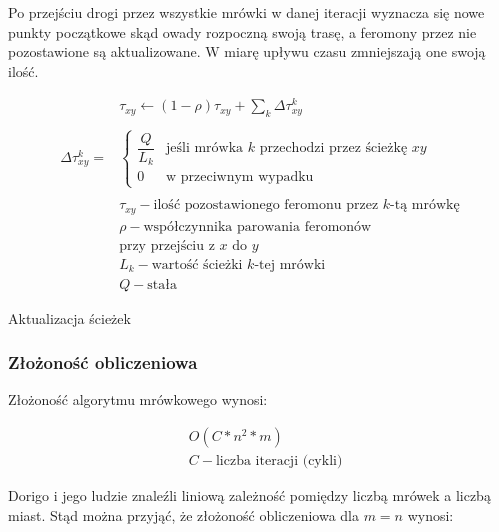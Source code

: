 \documentclass[12pt,a4paper,titlepage]{article}
\begin{document}
Po przejściu drogi przez wszystkie mrówki w danej iteracji wyznacza się nowe punkty początkowe skąd owady rozpoczną swoją trasę, a feromony przez nie pozostawione są aktualizowane. W miarę upływu czasu zmniejszają one swoją ilość.
\begin{myequation}[H]
\begin{equation}
    \begin{split}
        &\tau_{xy}\gets(1- \rho)\tau_{xy} + \sum\limits_{k}\Delta\tau^{k}_{xy} \\\\
        \Delta\tau^{k}_{xy} = 
        &\begin{cases}
            \dfrac{Q}{L_{k}} & \text{jeśli mrówka $k$ przechodzi przez ścieżkę $xy$} \\
            0 & \text{w przeciwnym wypadku}
        \end{cases} \\\\
        &\tau_{xy} - \text{ilość pozostawionego feromonu przez $k$-tą mrówkę} \\
        &\rho - \text{współczynnika parowania feromonów} \\
        &\text{przy przejściu z $x$ do $y$} \\
        &L_{k} - \text{wartość ścieżki $k$-tej mrówki} \\
        &Q - \text{stała}
    \end{split}
\end{equation}
\caption{Aktualizacja ścieżek}
\end{myequation}

\subsubsection{Złożoność obliczeniowa}
Złożoność algorytmu mrówkowego wynosi\cite{aco_pwr}:
\begin{myequation}[H]
\begin{equation}
    \begin{split}
        &O(C*n^{2}*m) \\
        &C - \text{liczba iteracji (cykli)}
    \end{split}
\end{equation}
\end{myequation}

\begin{flushleft}
Dorigo i jego ludzie znaleźli liniową zależność pomiędzy liczbą mrówek a liczbą miast.
Stąd można przyjąć, że złożoność obliczeniowa dla $m = n$ wynosi:
\end{flushleft}
\end{document}
